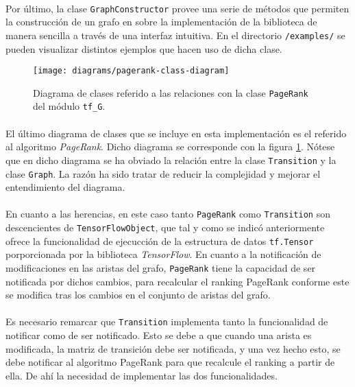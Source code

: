 \documentclass{subfiles}
\begin{document}
          \paragraph{}
          Por último, la clase \texttt{GraphConstructor} provee una serie de métodos que permiten la construcción de un grafo en sobre la implementación de la biblioteca de manera sencilla a través de una interfaz intuitiva. En el directorio \texttt{/examples/} se pueden visualizar distintos ejemplos que hacen uso de dicha clase.

          \begin{figure}[h!]
            \centering
            \texttt{[image: diagrams/pagerank-class-diagram]}
            \caption{Diagrama de clases referido a las relaciones con la clase \texttt{PageRank} del módulo \texttt{tf\_G}.}
            \label{img:pagerank_diagram}
          \end{figure}

          \paragraph{}
          El último diagrama de clases que se incluye en esta implementación es el referido al algoritmo \emph{PageRank}. Dicho diagrama se corresponde con la figura \ref{img:pagerank_diagram}. Nótese que en dicho diagrama se ha obviado la relación entre la clase \texttt{Transition} y la clase \texttt{Graph}. La razón ha sido tratar de reducir la complejidad y mejorar el entendimiento del diagrama.

          \paragraph{}
          En cuanto a las herencias, en este caso tanto \texttt{PageRank} como \texttt{Transition} son descencientes de \texttt{TensorFlowObject}, que tal y como se indicó anteriormente ofrece la funcionalidad de ejecucción de la estructura de datos \texttt{tf.Tensor} porporcionada por la biblioteca \emph{TensorFlow}. En cuanto a la notificación de modificaciones en las aristas del grafo, \texttt{PageRank} tiene la capacidad de ser notificada por dichos cambios, para recalcular el ranking PageRank conforme este se modifica tras los cambios en el conjunto de aristas del grafo.

          \paragraph{}
          Es necesario remarcar que \texttt{Transition} implementa tanto la funcionalidad de notificar como de ser notificado. Esto se debe a que cuando una arista es modificada, la matriz de transición debe ser notificada, y una vez hecho esto, se debe notificar al algoritmo PageRank para que recalcule el ranking a partir de ella. De ahí la necesidad de implementar las dos funcionalidades.
\end{document}

